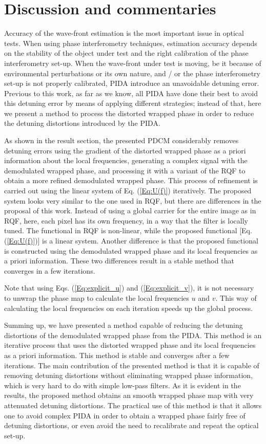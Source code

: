 \section{Discussion and commentaries}
Accuracy of the wave-front estimation is the most important issue in optical 
tests. When using phase interferometry techniques, estimation accuracy depends 
on the stability of the object under test and the right calibration of the 
phase 
interferometry set-up. When the wave-front under test is moving, be it because 
of environmental perturbations or its own nature, and / or the phase 
interferometry set-up is not properly calibrated, PIDA introduce an unavoidable 
detuning error. Previous to this work, as far as we know, all PIDA have done 
their best to avoid this detuning error by means of applying different 
strategies; instead of that, here we present a method to process the distorted 
wrapped phase in order to reduce the detuning distortions introduced by the 
PIDA.

As shown in the result section, the presented PDCM considerably 
removes detuning errors using the gradient of the distorted wrapped phase as a 
priori information about the local frequencies, generating a complex signal 
with the demodulated wrapped phase, and processing it with a variant of the RQF 
to obtain a more refined demodulated wrapped phase. This process of refinement 
is carried out using the linear system of Eq. (\ref{Eq:U(f)}) iteratively. The 
proposed system looks very similar to the one used in RQF, but there 
are differences in the proposal of this work. Instead of using a global 
carrier for the entire image as in RQF, here, each pixel has its own 
frequency, in a way that the filter is locally tuned. The functional in 
RQF is non-linear, while the proposed functional [Eq. (\ref{Eq:U(f)})] 
is a linear system. Another difference is that the proposed functional is 
constructed using the demodulated wrapped phase and its local frequencies as a 
priori information. These two differences result in a stable method that 
converges in a few iterations. 

Note that using Eqs. (\ref{Eq:explicit_u}) and (\ref{Eq:explicit_v}), it is 
not necessary to unwrap the phase map to calculate the local frequencies 
$u$ and $v$. This way of calculating the local frequencies on each 
iteration speeds up the global process.

Summing up, we have presented a method capable of reducing the 
detuning distortions of the demodulated wrapped phase from the PIDA. This 
method is an iterative process that uses the distorted wrapped phase and 
its local frequencies as a priori information. This method is stable and 
converges after a few iterations. The main contribution of the presented 
method is that it is capable of removing detuning distortions without 
eliminating wrapped phase information, which is very hard to do with 
simple low-pass filters. As it is evident in the results, the proposed 
method obtains an smooth wrapped phase map with very attenuated detuning 
distortions. The practical use of this method is that it allows one to avoid 
complex PIDA in order to obtain a wrapped phase fairly free of detuning 
distortions, or even avoid the need to recalibrate and repeat the optical 
set-up.

